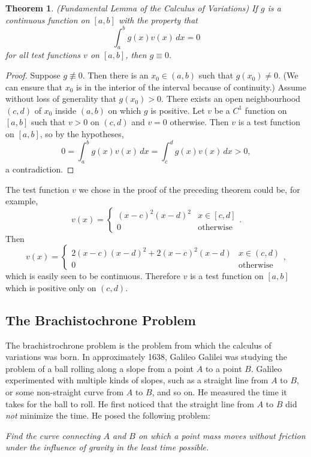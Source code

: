 \documentclass[11pt]{book}
\newtheorem{theorem}{Theorem}[subsection]
\begin{document}
\begin{theorem}
(Fundamental Lemma of the Calculus of Variations) If $g$ is a continuous function on $[a,b]$ with the property that
\[
\int_a^b g(x)v(x) \, dx = 0
\]
for all test functions $v$ on $[a,b]$, then $g \equiv 0$.
\end{theorem}
\begin{proof}
Suppose $g\not\equiv 0$. Then there is an $x_0 \in (a,b)$ such that $g(x_0) \neq 0$. (We can ensure that $x_0$ is in the interior of the interval because of continuity.) Assume without loss of generality that $g(x_0) > 0$. There exists an open neighbourhood $(c,d)$ of $x_0$ inside $(a,b)$ on which $g$ is positive. Let $v$ be a $C^1$ function on $[a,b]$ such that $v > 0$ on $(c,d)$ and $v = 0$ otherwise. Then $v$ is a test function on $[a,b]$, so by the hypotheses,
\[
0 = \int_a^b g(x)v(x) \, dx = \int_c^d g(x)v(x) \, dx > 0,
\]
a contradiction.
\end{proof}
The test function $v$ we chose in the proof of the preceding theorem could be, for example,	
\[
v(x) = \begin{cases} 
(x-c)^2(x-d)^2 & x \in [c,d] \\
0 & \text{otherwise}
\end{cases}.
\]
Then
\[
v(x) = \begin{cases} 
2(x-c)(x-d)^2 + 2(x-c)^2(x-d) & x \in (c,d) \\
0 & \text{otherwise}
\end{cases},
\]
which is easily seen to be continuous. Therefore $v$ is a test function on $[a,b]$ which is positive only on $(c,d)$.

\subsection{The Brachistochrone Problem}

The brachistrochrone problem is the problem from which the calculus of variations was born. In approximately 1638, Galileo Galilei was studying the problem of a ball rolling along a slope from a point $A$ to a point $B$. Galileo experimented with multiple kinds of slopes, such as a straight line from $A$ to $B$, or some non-straight curve from $A$ to $B$, and so on. He measured the time it takes for the ball to roll. He first noticed that the straight line from $A$ to $B$ did \emph{not} minimize the time. He posed the following problem: 

\emph{Find the curve connecting $A$ and $B$ on which a point mass moves without friction under the influence of gravity in the least time possible.}
\end{document}
